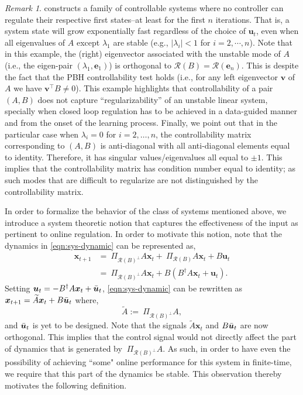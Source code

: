 \documentclass[journal]{IEEEtran}
\theoremstyle{definition}
\theoremstyle{remark}
\newtheorem{remark}{Remark}
\newcommand\x{{\bm x}}
\def\u{{\bm u}}
\def\v{{\bm v}}
\newcommand \e{{\bm e}}
\begin{document}
	\begin{remark}
	\label{rmk:motivateExample}
	 constructs a family of controllable systems where no controller can regulate their respective first states--at least for the first $n$ iterations.
	That is, a system state will grow exponentially fast regardless of the choice of $\u_t$, even when all eigenvalues of $A$ except $\lambda_1$ are stable (e.g., $|\lambda_i| < 1$ for $i=2,\cdots,n$).
	Note that in this example, the (right) eigenvector associated with the unstable mode of $A$ (i.e., the eigen-pair $(\lambda_1,\e_1)$) is orthogonal to $\mathcal{R}(B) = \mathcal{R}(\e_n)$.
	This is despite the fact that the \ac{PBH} controllability test holds (i.e., for any left eigenvector $\v$ of $A$ we have $\v^\intercal B \neq 0$).
	This example highlights that controllability of a pair $(A,B)$ does not capture ``regularizability'' of an unstable linear system, specially when closed loop regulation has to be achieved in a data-guided manner and from the onset of the learning process.
	Finally, we point out that in the particular case when $\lambda_i = 0$ for $i=2,\dots,n$, the controllability matrix corresponding to $(A,B)$ is anti-diagonal with all anti-diagonal elements equal to identity.
	Therefore, it has singular values/eigenvalues all equal to $\pm 1$.
	This implies that the controllability matrix has condition number equal to identity; as such modes that are difficult to
	regularize are not distinguished by the controllability matrix.
	\end{remark}
	
    
	In order to formalize the behavior of the class
	of systems mentioned above, we introduce a system theoretic notion that captures the effectiveness of the input as pertinent to online regulation.
    In order to motivate this notion, note that the dynamics in \cref{eqn:sys-dynamic} can be represented as,
    \begin{align*}
        \x_{t+1} 
        &= ~\Pi_{\mathcal{R}(B)^\perp} A \x_t + ~\Pi_{\mathcal{R}(B)} A \x_t + B \u_t\\
        &= ~\Pi_{\mathcal{R}(B)^\perp} A \x_t + B ( B^\dagger A \x_t + \u_t).
    \end{align*}
    Setting $\u_t = -B^\dagger A \x_t + \Bar{\u}_t$, \cref{eqn:sys-dynamic} can be rewritten as 
    \(\x_{t+1} = \widetilde{A} \x_t + B \Bar{\u}_t \)
    where,
    \begin{equation}
        \label{eqn:Atilde}
        \widetilde{A} := ~\Pi_{\mathcal{R}(B)^\perp} A,
    \end{equation}
    and $\Bar{\u}_t$ is yet to be designed.
    Note that the signals $\widetilde{A} \x_t$ and $B \Bar{\u}_t$ are now orthogonal. 
    This implies that the control signal would not directly affect the part of dynamics that is generated by $~\Pi_{\mathcal{R}(B)^\perp} A$. 
    As such, in order to have even the possibility of achieving ``some" online performance for this system in finite-time, we require that this part of the dynamics be stable. 
	This observation thereby motivates
	the following definition.
	
\end{document}
